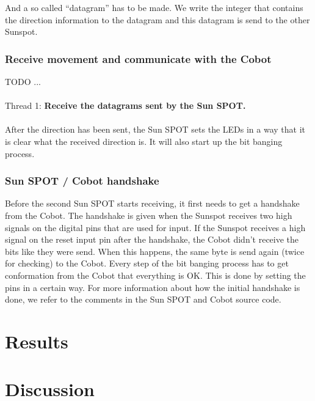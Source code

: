 \documentclass[a4paper,10pt]{article} %
\begin{document}
And a so called ``datagram'' has to be made. We write the integer that contains
the direction information to the datagram and this datagram is send to the other
Sunspot.


\subsubsection{Receive movement and communicate with the Cobot} %
TODO ...
\\
\\
\noindent Thread 1: \textbf{Receive the datagrams sent by the Sun SPOT.}
\\
\\
After the direction has been sent, the Sun SPOT sets the LEDs in a way that
it is clear what the received direction is. It will also start up the bit
banging process.


\subsubsection{Sun SPOT / Cobot handshake} %
\label{subsub:Sun SPOT / Cobot handshake}

Before the second Sun SPOT starts receiving, it first needs to get a handshake
from the Cobot. The handshake is given when the Sunspot receives two high
signals on the digital pins that are used for input. If the Sunspot receives a
high signal on the reset input pin after the handshake, the Cobot didn't receive
the bits like they were send. When this happens, the same byte is send again
(twice for checking) to the Cobot. Every step of the bit banging process has to
get conformation from the Cobot that everything is OK. This is done by setting
the pins in a certain way. For more information about how the initial handshake
is done, we refer to the comments in the Sun SPOT and Cobot source code.




\section{Results} %
\label{sec:Results}


\section{Discussion} %
\end{document}
